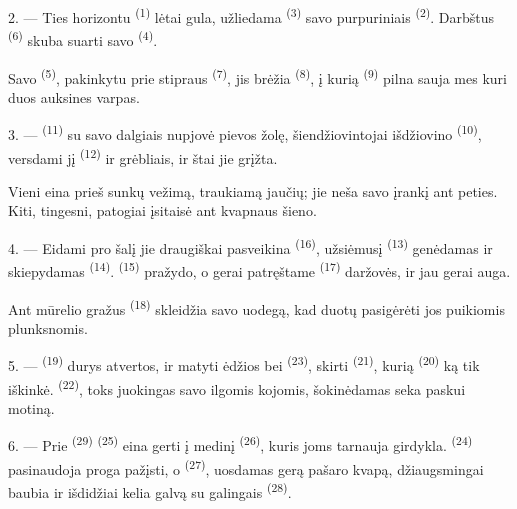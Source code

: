 2. --- Ties horizontu  \textsuperscript{(1)} lėtai gula, užliedama
 \textsuperscript{(3)} savo purpuriniais 
\textsuperscript{(2)}. Darbštus  \textsuperscript{(6)} skuba suarti
savo  \textsuperscript{(4)}.

Savo  \textsuperscript{(5)}, pakinkytu prie stipraus 
\textsuperscript{(7)}, jis brėžia  \textsuperscript{(8)}, į kurią
 \textsuperscript{(9)} pilna sauja mes  kuri duos
auksines varpas.

3. ---  \textsuperscript{(11)} su savo dalgiais nupjovė pievos
žolę, šiendžiovintojai išdžiovino  \textsuperscript{(10)}, versdami jį
 \textsuperscript{(12)} ir grėbliais, ir štai jie grįžta.

Vieni eina prieš sunkų vežimą, traukiamą jaučių; jie neša savo įrankį ant peties.
Kiti, tingesni, patogiai įsitaisė ant kvapnaus šieno.

4. --- Eidami pro šalį jie draugiškai pasveikina 
\textsuperscript{(16)}, užsiėmusį  \textsuperscript{(13)}
genėdamas  ir skiepydamas 
\textsuperscript{(14)}.  \textsuperscript{(15)} pražydo, o gerai
patręštame  \textsuperscript{(17)} daržovės,  ir
 jau gerai auga.

Ant mūrelio gražus  \textsuperscript{(18)} skleidžia savo uodegą, kad
duotų pasigėrėti jos puikiomis plunksnomis.

\VUsaut{3.0mm}

5. ---  \textsuperscript{(19)} durys atvertos, ir matyti ėdžios bei
 \textsuperscript{(23)}, skirti 
\textsuperscript{(21)}, kurią  \textsuperscript{(20)} ką tik
iškinkė.  \textsuperscript{(22)}, toks juokingas savo ilgomis
kojomis, šokinėdamas seka paskui motiną.

6. --- Prie  \textsuperscript{(29)} 
\textsuperscript{(25)} eina gerti į medinį  \textsuperscript{(26)}, kuris
joms tarnauja girdykla.  \textsuperscript{(24)} pasinaudoja proga
pažįsti, o  \textsuperscript{(27)}, uosdamas gerą pašaro kvapą,
džiaugsmingai baubia ir išdidžiai kelia galvą su galingais 
\textsuperscript{(28)}.

